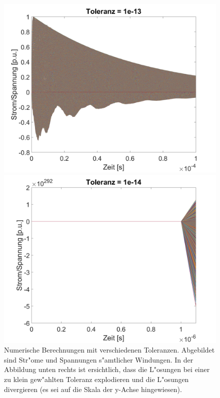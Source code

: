 \begin{refsection}
\begin{figure}
\begin{minipage}{.5\textwidth}
	        \includegraphics[width=\linewidth]{./trafo/images/svd13.png}
	    \end{minipage}%
	    \begin{minipage}{.5\textwidth}
	        \centering
	        \includegraphics[width=\linewidth]{./trafo/images/svd14.png}
	    \end{minipage}
	    \caption{Numerische Berechnungen mit verschiedenen Toleranzen. Abgebildet sind Str"ome und Spannungen s"amtlicher Windungen. In der Abbildung unten rechts ist ersichtlich, dass die L"osungen bei einer zu klein gew"ahlten Toleranz explodieren und die L"osungen divergieren (es sei auf die Skala der y-Achse hingewiesen). }
	    \label{trafo:SVDTol}
	\end{figure}


\end{refsection}
